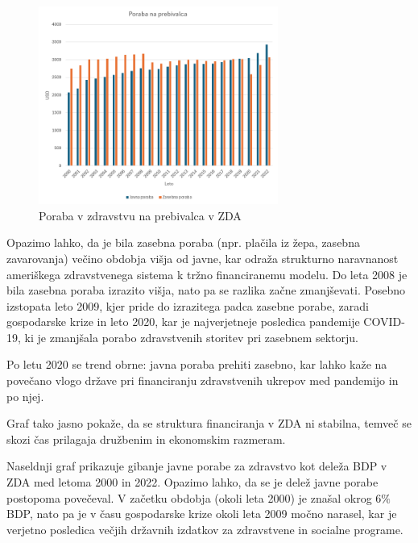 \documentclass[12pt,a4paper]{article}
\theoremstyle{definition}
\begin{document}
\begin{figure}[H]
    \centering
    \includegraphics[width=0.7\textwidth]{zda_poraba_na_prebivalca.png}
    \caption{Poraba v zdravstvu na prebivalca v ZDA}
    \label{fig:zda_poraba_na_prebivalca}
\end{figure}

Opazimo lahko, da je bila zasebna poraba (npr. plačila iz žepa, zasebna zavarovanja) večino obdobja višja od javne, 
kar odraža strukturno naravnanost ameriškega zdravstvenega sistema k tržno financiranemu modelu. 
Do leta 2008 je bila zasebna poraba izrazito višja, nato pa se razlika začne zmanjševati. 
Posebno izstopata leto 2009, kjer pride do izrazitega padca zasebne porabe, zaradi gospodarske krize in leto 2020, 
kar je najverjetneje posledica pandemije COVID-19, ki je zmanjšala porabo zdravstvenih storitev pri zasebnem sektorju.

Po letu 2020 se trend obrne: javna poraba prehiti zasebno, 
kar lahko kaže na povečano vlogo države pri financiranju zdravstvenih ukrepov med pandemijo in po njej. 

Graf tako jasno pokaže, da se struktura financiranja v ZDA ni stabilna, 
temveč se skozi čas prilagaja družbenim in ekonomskim razmeram.

Naseldnji graf prikazuje gibanje javne porabe za zdravstvo kot deleža BDP v ZDA med letoma 2000 in 2022. 
Opazimo lahko, da se je delež javne porabe postopoma povečeval. 
V začetku obdobja (okoli leta 2000) je znašal okrog $6 \%$ BDP, 
nato pa je v času gospodarske krize okoli leta 2009 močno narasel, 
kar je verjetno posledica večjih državnih izdatkov za zdravstvene in socialne programe.
\end{document}

